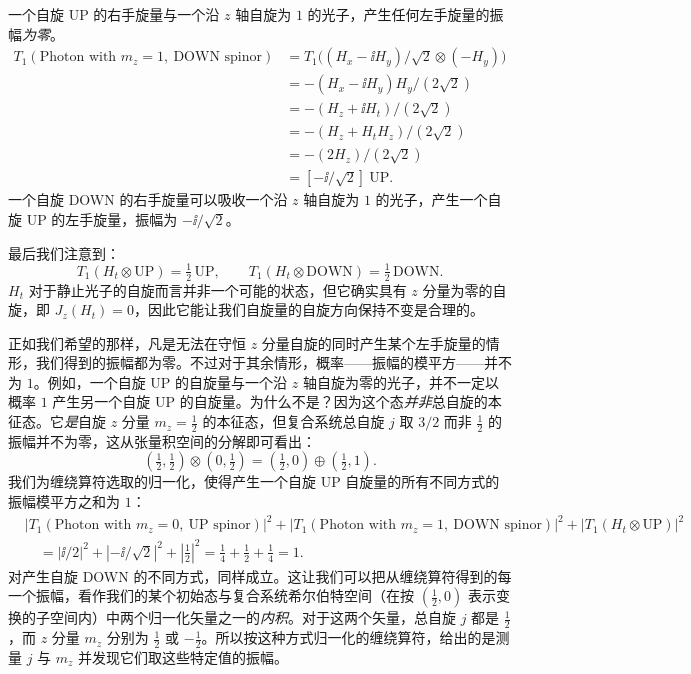 一个自旋 UP 的右手旋量与一个沿 $z$ 轴自旋为 $1$ 的光子，产生任何左手旋量的振幅\emph{为零}。
\begin{align*}
T_1(\text{Photon with }m_z=1,\ \text{DOWN spinor})
&= T_1\bigl((H_x-\ii H_y)/\sqrt2\otimes(-H_y)\bigr)\\
&= -(H_x-\ii H_y)H_y/(2\sqrt2)\\
&= -(H_z+\ii H_t)/(2\sqrt2)\\
&= -(H_z+H_t H_z)/(2\sqrt2)\\
&= -(2H_z)/(2\sqrt2)\\
&= [-\ii/\sqrt2]\ \text{UP}.
\end{align*}
一个自旋 DOWN 的右手旋量可以吸收一个沿 $z$ 轴自旋为 $1$ 的光子，产生一个自旋 UP 的左手旋量，振幅为 $-\ii/\sqrt2$。

最后我们注意到：
\begin{equation*}
T_1(H_t\otimes\text{UP})=\tfrac12\,\text{UP},\qquad
T_1(H_t\otimes\text{DOWN})=\tfrac12\,\text{DOWN}.
\end{equation*}
$H_t$ 对于静止光子的自旋而言并非一个可能的状态，但它确实具有 $z$ 分量为零的自旋，即 $J_z(H_t)=0$，因此它能让我们自旋量的自旋方向保持不变是合理的。

正如我们希望的那样，凡是无法在守恒 $z$ 分量自旋的同时产生某个左手旋量的情形，我们得到的振幅都为零。不过对于其余情形，概率——振幅的模平方——并不为 $1$。例如，一个自旋 UP 的自旋量与一个沿 $z$ 轴自旋为零的光子，并不一定以概率 $1$ 产生另一个自旋 UP 的自旋量。为什么不是？因为这个态\emph{并非}总自旋的本征态。它\emph{是}自旋 $z$ 分量 $m_z=\tfrac12$ 的本征态，但复合系统总自旋 $j$ 取 $3/2$ 而非 $\tfrac12$ 的振幅并不为零，这从张量积空间的分解即可看出：
\begin{equation*}
(\tfrac12,\tfrac12)\otimes(0,\tfrac12)=(\tfrac12,0)\oplus(\tfrac12,1).
\end{equation*}
我们为缠绕算符选取的归一化，使得产生一个自旋 UP 自旋量的所有不同方式的振幅模平方之和为 $1$：
\begin{align*}
&|T_1(\text{Photon with }m_z=0,\ \text{UP spinor})|^{2}
+|T_1(\text{Photon with }m_z=1,\ \text{DOWN spinor})|^{2}
+|T_1(H_t\otimes\text{UP})|^{2}\\
&\quad= |\ii/2|^{2}+|-\ii/\sqrt2|^{2}+|\tfrac12|^{2}
=\tfrac14+\tfrac12+\tfrac14=1 .
\end{align*}
对产生自旋 DOWN 的不同方式，同样成立。这让我们可以把从缠绕算符得到的每一个振幅，看作我们的某个初始态与复合系统希尔伯特空间（在按 $(\tfrac12,0)$ 表示变换的子空间内）中两个归一化矢量之一的\emph{内积}。对于这两个矢量，总自旋 $j$ 都是 $\tfrac12$，而 $z$ 分量 $m_z$ 分别为 $\tfrac12$ 或 $-\tfrac12$。所以按这种方式归一化的缠绕算符，给出的是测量 $j$ 与 $m_z$ 并发现它们取这些特定值的振幅。

